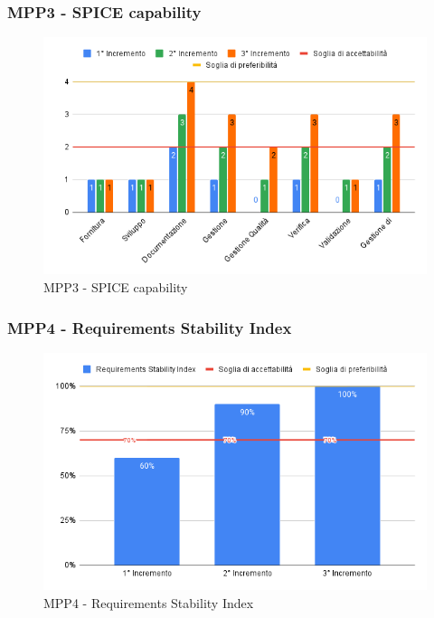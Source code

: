\subsubsection{MPP3 - SPICE capability}

\begin{figure}[H]
	\centering
	\includegraphics[scale = 0.6]{sezioni/Images/SPICECapability.png}
	\caption{MPP3 - SPICE capability}
\end{figure}

\subsubsection{MPP4 - Requirements Stability Index}

\begin{figure}[H]
	\centering
	\includegraphics[scale = 0.6]{sezioni/Images/RequirementsStabilityIndex.png}
	\caption{MPP4 - Requirements Stability Index}
\end{figure}


